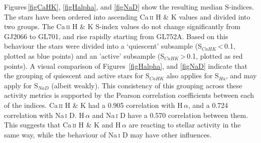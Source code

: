 Figures\,\ref{figCaHK}, \ref{figHalpha}, and \ref{figNaD} show the resulting median S-indices. The stars have been ordered into ascending Ca\,\textsc{ii} H \& K values and divided into two groups. The Ca\,\textsc{ii} H \& K S-index values do not change significantly from GJ2066 to GL701, and rise rapidly starting from GL752A. Based on this behaviour the stars were divided into a `quiescent' subsample (S$_{CaHK}$\,\textless\,0.1, plotted as blue points) and an 'active' subsample (S$_{CaHK}$\,\textgreater\,0.1, plotted as red points). A visual comparison of Figures~\ref{figHalpha}, and \ref{figNaD} indicate that the grouping of quiescent and active stars for S$_{CaHK}$ also applies for S$_{Ha}$, and may apply for S$_{NaD}$ (albeit weakly). This consistency of this grouping across these activity metrics is supported by the Pearson correlation coefficients between each of the indices. Ca\,\textsc{ii} H \& K had a 0.905 correlation with H\,\textsc{$\alpha$}, and a 0.724 correlation with Na\,\textsc{i} D. H\,\textsc{$\alpha$} and Na\,\textsc{i} D have a 0.570 correlation between them. This suggests that Ca\,\textsc{ii} H \& K and H\,\textsc{$\alpha$} are reacting to stellar activity in the same way, while the behaviour of Na\,\textsc{i} D may have other influences. 

